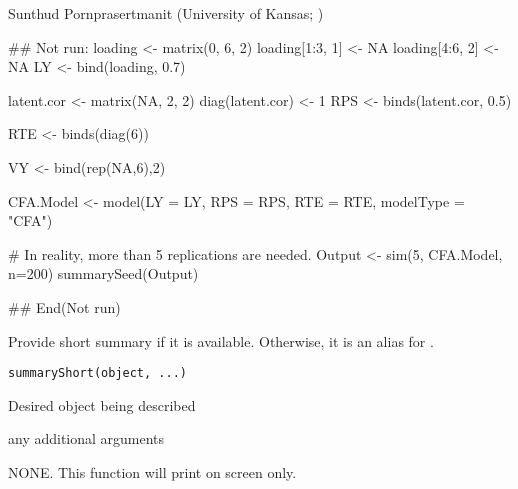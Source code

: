 \documentclass[a4paper]{book}
\begin{document}
%
\begin{Author}\relax
Sunthud Pornprasertmanit (University of Kansas; )
\end{Author}
%
\begin{Examples}
\begin{ExampleCode}
## Not run: 
loading <- matrix(0, 6, 2)
loading[1:3, 1] <- NA
loading[4:6, 2] <- NA
LY <- bind(loading, 0.7)

latent.cor <- matrix(NA, 2, 2)
diag(latent.cor) <- 1
RPS <- binds(latent.cor, 0.5)

RTE <- binds(diag(6))

VY <- bind(rep(NA,6),2)

CFA.Model <- model(LY = LY, RPS = RPS, RTE = RTE, modelType = "CFA")

# In reality, more than 5 replications are needed.
Output <- sim(5, CFA.Model, n=200)
summarySeed(Output)

## End(Not run)
\end{ExampleCode}
\end{Examples}
%
\begin{Description}\relax
Provide short summary if it is available. Otherwise, it is an alias for .
\end{Description}
%
\begin{Usage}
\begin{verbatim}
summaryShort(object, ...)
\end{verbatim}
\end{Usage}
%
\begin{Arguments}
\begin{ldescription}
\item[\code{object}] 
Desired object being described

\item[\code{...}] 
any additional arguments

\end{ldescription}
\end{Arguments}
%
\begin{Value}
NONE. This function will print on screen only.
\end{Value}
\end{document}
